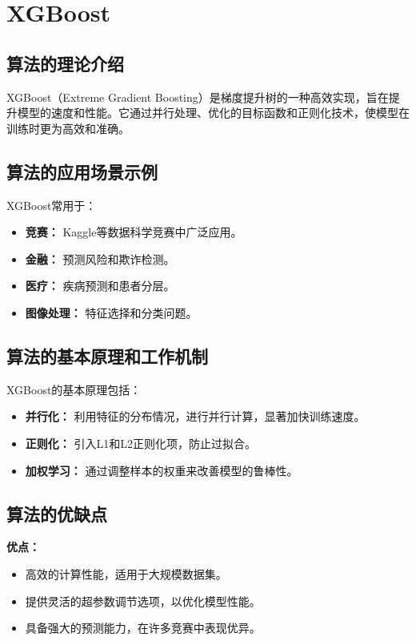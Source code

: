 \section{XGBoost}
\subsection*{算法的理论介绍}
XGBoost（Extreme Gradient Boosting）是梯度提升树的一种高效实现，旨在提升模型的速度和性能。它通过并行处理、优化的目标函数和正则化技术，使模型在训练时更为高效和准确。

\subsection*{算法的应用场景示例}
XGBoost常用于：
\begin{itemize}
    \item \textbf{竞赛：} Kaggle等数据科学竞赛中广泛应用。
    \item \textbf{金融：} 预测风险和欺诈检测。
    \item \textbf{医疗：} 疾病预测和患者分层。
    \item \textbf{图像处理：} 特征选择和分类问题。
\end{itemize}

\subsection*{算法的基本原理和工作机制}
XGBoost的基本原理包括：
\begin{itemize}
    \item \textbf{并行化：} 利用特征的分布情况，进行并行计算，显著加快训练速度。
    \item \textbf{正则化：} 引入L1和L2正则化项，防止过拟合。
    \item \textbf{加权学习：} 通过调整样本的权重来改善模型的鲁棒性。
\end{itemize}

\subsection*{算法的优缺点}
\textbf{优点：}
\begin{itemize}
    \item 高效的计算性能，适用于大规模数据集。
    \item 提供灵活的超参数调节选项，以优化模型性能。
    \item 具备强大的预测能力，在许多竞赛中表现优异。
\end{itemize}

